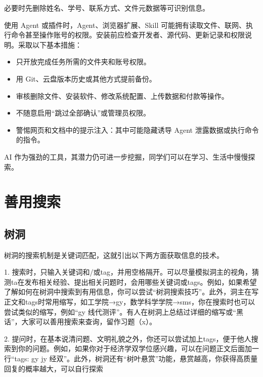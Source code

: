 必要时先删除姓名、学号、联系方式、文件元数据等可识别信息。

使用 Agent 或插件时，Agent、浏览器扩展、Skill 可能拥有读取文件、联网、执行命令甚至操作账号的权限。安装前应检查开发者、源代码、更新记录和权限说明。采取以下基本措施：

\begin{itemize}
    \item 只开放完成任务所需的文件夹和账号权限。
    \item 用 Git、云盘版本历史或其他方式提前备份。
    \item 审核删除文件、安装软件、修改系统配置、上传数据和付款等操作。
    \item 不随意启用“跳过全部确认”或管理员权限。
    \item 警惕网页和文档中的提示注入：其中可能隐藏诱导 Agent 泄露数据或执行命令的指令。
\end{itemize}

\vspace{10pt}

AI 作为强劲的工具，其潜力仍可进一步挖掘，同学们可以在学习、生活中慢慢探索。

\section{善用搜索}
\subsection{树洞}

\vspace{10pt}
树洞的搜索机制是关键词匹配，这就引出以下两方面获取信息的技术。

\vspace{10pt}
1. 搜索时，只输入关键词和/或tag，并用空格隔开。可以尽量模拟洞主的视角，猜测ta在发布相关经验、提出相关问题时，会用哪些关键词或tags。例如，如果希望了解如何在树洞中搜索到有用信息，你可以尝试“树洞\enspace 搜索\enspace 技巧”。此外，洞主在写正文和tags时常用缩写，如工学院→gy，数学科学学院→sms，你在搜索时也可以尝试类似的缩写，例如“gy 线代\enspace 测评”。有人在树洞上总结过详细的缩写或“黑话”，大家可以善用搜索来查询，留作习题（x）。

\vspace{10pt}

2. 提问时，在基本说清问题、文明礼貌之外，你还可以尝试加上tags，便于他人搜索到你的问题。例如，如果你对于经济学双学位感兴趣，可以在问题正文后面加一行“tags: gy jy 经双”。此外，树洞还有“树叶悬赏”功能，悬赏越高，你获得高质量回复的概率越大，可以自行探索~

